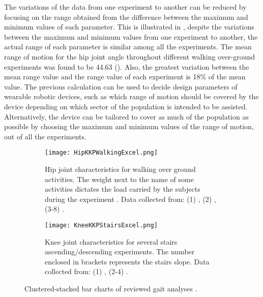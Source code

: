 The variations of the data from one experiment to another can be reduced by focusing on the range obtained from the difference between the maximum and minimum values of each parameter. This is illustrated in , despite the variations between the maximum and minimum values from one experiment to another, the actual range of each parameter is similar among all the experiments. The mean range of motion for the hip joint angle throughout different walking over-ground experiments was found to be 44.63\degree{} (). Also, the greatest variation between the mean range value and the range value of each experiment is 18\% of the mean value. The previous calculation can be used to decide design parameters of wearable robotic devices, such as which range of motion should be covered by the device depending on which sector of the population is intended to be assisted. Alternatively, the device can be tailored to cover as much of the population as possible by choosing the maximum and minimum values of the range of motion, out of all the experiments. 
\begin{figure}[htbp]
    \centering
    \begin{subfigure}[b]{0.75\textwidth}
        \centering
        \texttt{[image: HipKKPWalkingExcel.png]}
        \caption{Hip joint characteristics for walking over ground activities. The weight next to the name of some activities dictates the load carried by the subjects during the experiment \cite{solis2017characterization}. Data collected from: (1) \cite{bovi2011multiple}, (2) \cite{lee2008biomechanics}, (3-8) \cite{han2011biomechanical}. }
        \label{fig:HipKKPWalking}
    \end{subfigure}
    \hfill
    \begin{subfigure}[b]{0.75\textwidth}
        \centering
        \texttt{[image: KneeKKPStairsExcel.png]}
        \caption{Knee joint characteristics for several stairs ascending/descending experiments. The number enclosed in brackets represents the stairs slope. Data collected from: (1) \cite{riener2002stair}, (2-4) \cite{reid2007knee}. }
        \label{fig:KneeKKPWalking}
    \end{subfigure}
    \caption{Clustered-stacked bar charts of reviewed gait analyses \cite{solis2017characterization}. }
    \label{fig:clusteredMain}
\end{figure}

